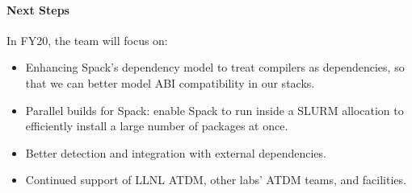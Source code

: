 \paragraph{Next Steps}
In FY20, the team will focus on:

\begin{itemize}
    \item Enhancing Spack's dependency model to treat compilers as
    dependencies, so that we can better model ABI compatibility in our
    stacks.

    \item Parallel builds for Spack: enable Spack to run inside a SLURM
    allocation to efficiently install a large number of packages at once.

    \item Better detection and integration with external dependencies.

    \item Continued support of LLNL ATDM, other labs' ATDM teams, and
          facilities.
\end{itemize}
